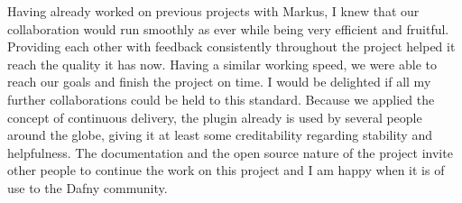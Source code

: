 Having already worked on previous projects with Markus, I knew that our collaboration would run smoothly as ever while being very efficient and fruitful. Providing each other with feedback consistently throughout the project helped it reach the quality it has now. Having a similar working speed, we were able to reach our goals and finish the project on time. I would be delighted if all my further collaborations could be held to this standard. \newline
Because we applied the concept of continuous delivery, the plugin already is used by several people around the globe, giving it at least some creditability regarding stability and helpfulness. The documentation and the open source nature of the project invite other people to continue the work on this project and I am happy when it is of use to the Dafny community. 
